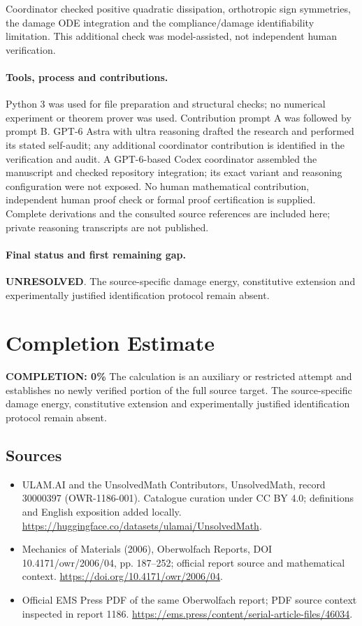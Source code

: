 \documentclass[11pt]{article}
\begin{document}
Coordinator checked positive quadratic dissipation, orthotropic sign symmetries, the damage ODE integration and the compliance/damage identifiability limitation. This additional check was model-assisted, not independent human verification.

\paragraph{Tools, process and contributions.}
Python 3 was used for file preparation and structural checks; no numerical experiment or theorem prover was used. Contribution prompt A was followed by prompt B. GPT-6 Astra with ultra reasoning drafted the research and performed its stated self-audit; any additional coordinator contribution is identified in the verification and audit. A GPT-6-based Codex coordinator assembled the manuscript and checked repository integration; its exact variant and reasoning configuration were not exposed. No human mathematical contribution, independent human proof check or formal proof certification is supplied. Complete derivations and the consulted source references are included here; private reasoning transcripts are not published.

\paragraph{Final status and first remaining gap.}
\textbf{UNRESOLVED}. The source-specific damage energy, constitutive extension and experimentally justified identification protocol remain absent.

\section{Completion Estimate}
\noindent\textbf{COMPLETION: 0\%}
The calculation is an auxiliary or restricted attempt and establishes no newly verified portion of the full source target. The source-specific damage energy, constitutive extension and experimentally justified identification protocol remain absent.

\subsection{Sources}
\begin{itemize}
\item[\hypertarget{source:30000397:1}{S1}] ULAM.AI and the UnsolvedMath Contributors, UnsolvedMath, record 30000397 (OWR-1186-001). Catalogue curation under CC BY 4.0; definitions and English exposition added locally.
\url{https://huggingface.co/datasets/ulamai/UnsolvedMath}.
\item[\hypertarget{source:30000397:2}{S2}] Mechanics of Materials (2006), Oberwolfach Reports, DOI 10.4171/owr/2006/04, pp. 187--252; official report source and mathematical context.
\url{https://doi.org/10.4171/owr/2006/04}.
\item[\hypertarget{source:30000397:3}{S3}] Official EMS Press PDF of the same Oberwolfach report; PDF source context inspected in report 1186.
\url{https://ems.press/content/serial-article-files/46034}.
\end{itemize}
\label{end:30000397}
\end{document}
